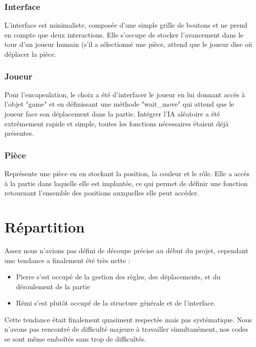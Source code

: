 \documentclass{article}
\begin{document}
\subsubsection{Interface}
L'interface est minimaliste, composée d'une simple grille de boutons et ne prend en compte que deux interactions. Elle s'occupe de stocker l'avancement dans le tour d'un joueur humain (s'il a sélectionné une pièce, attend que le joueur dise où déplacer la pièce.

\subsubsection{Joueur}
Pour l'encapsulation, le choix a été d'interfacer le joueur en lui donnant accès à l'objet "game" et en définissant une méthode "wait\_move" qui attend que le joueur face son déplacement dans la partie. Intégrer l'IA aléatoire a été extrêmement rapide et simple, toutes les fonctions nécessaires étaient déjà présentes.

\subsubsection{Pièce}
Représente une pièce en en stockant la position, la couleur et le rôle. Elle a accès à la partie dans laquelle elle est implantée, ce qui permet de définir une fonction retournant l'ensemble des positions auxquelles elle peut accéder.


\section{Répartition}
Assez nous n'avions pas défini de découpe précise au début du projet, cependant une tendance a finalement été très nette :
\begin{itemize}
    \item Pierre s'est occupé de la gestion des règles, des déplacements, et du déroulement de la partie
    \item Rémi s'est plutôt occupé de la structure générale et de l'interface.
\end{itemize}
Cette tendance était finalement quasiment respectée mais pas systématique. Nous n'avons pas rencontré de difficulté majeure à travailler simultanément, nos codes se sont même emboîtés sans trop de difficultés.
\end{document}
